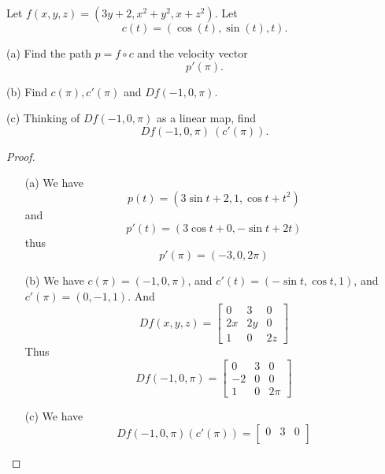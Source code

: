 \documentclass[openany]{book}
\begin{document}
\begin{prob}[2.5, Q11]
Let \( f(x, y, z) = (3y + 2, x^2 + y^2, x + z^2) \). Let  
\[
c(t) = (\cos(t), \sin(t), t).
\]  

(a) Find the path \( p = f \circ c \) and the velocity vector  
\[
p'(\pi).
\]  

(b) Find \( c(\pi), c'(\pi) \) and \( Df(-1, 0, \pi). \)  

(c) Thinking of \( Df(-1, 0, \pi) \) as a linear map, find  
\[
Df(-1, 0, \pi) \ (c'(\pi)).
\]
\end{prob}
\begin{proof}
    \begin{enumerate}
        \item[(a)] We have 
        \begin{equation*}
            p(t)=(3\sin t+2, 1, \cos t+t^2)
        \end{equation*}
        and 
        \begin{equation*}
            p'(t)=(3\cos t+0, -\sin t+2t)
        \end{equation*}
        thus 
        \begin{equation*}
            p'(\pi)=(-3,0,2\pi)
        \end{equation*}
        \item[(b)] We have $c(\pi)=(-1, 0, \pi)$, and $c'(t)=(-\sin t, \cos t, 1)$, and $c'(\pi)=(0,-1, 1)$. And 
        \begin{equation*}
            Df(x,y,z)=\begin{bmatrix}
                0&3&0\\
                2x&2y&0\\
                1&0&2z
            \end{bmatrix}
        \end{equation*}
        Thus 
        \begin{equation*}
            Df(-1,0,\pi)=\begin{bmatrix}
                0&3&0\\
                -2&0&0\\
                1&0&2\pi
            \end{bmatrix}
        \end{equation*}
        \item[(c)] We have 
        \begin{equation*}
            Df(-1,0,\pi)(c'(\pi))=\begin{bmatrix}
                0&3&0\\

\end{bmatrix}
\end{equation*}
\end{enumerate}
\end{proof}
\end{document}
